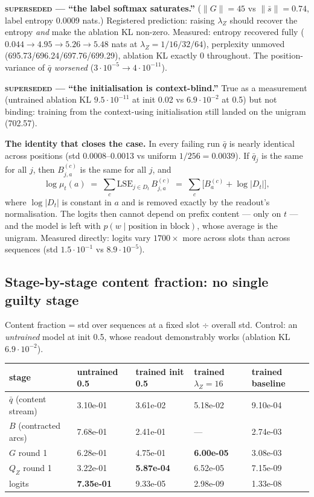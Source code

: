 \documentclass[10pt,a4paper]{article}
\newcommand{\qbar}{\ensuremath{\bar q}}
\begin{document}
\textbf{\textsc{superseded} --- ``the label softmax saturates.''} ($\lVert G\rVert = 45$ vs
$\lVert \bar s\rVert = 0.74$, label entropy 0.0009 nats.) Registered prediction: raising
$\lambda_Z$ should recover the entropy \emph{and} make the ablation KL non-zero. Measured:
entropy recovered fully ($0.044 \to 4.95 \to 5.26 \to 5.48$ nats at $\lambda_Z=1/16/32/64$),
perplexity unmoved (695.73/696.24/697.76/699.29), ablation KL exactly 0 throughout. The
position-variance of \qbar{} \emph{worsened} ($3\cdot10^{-5} \to 4\cdot10^{-11}$).

\textbf{\textsc{superseded} --- ``the initialisation is context-blind.''} True as a
measurement (untrained ablation KL $9.5\cdot10^{-11}$ at init 0.02 vs $6.9\cdot10^{-2}$ at
0.5) but not binding: training from the context-using initialisation still landed on the
unigram (702.57).

\textbf{The identity that closes the case.} In every failing run \qbar{} is nearly identical
across positions (std 0.0008--0.0013 vs uniform $1/256 = 0.0039$). If $\qbar_j$ is the same
for all $j$, then $B^{(c)}_{j,a}$ is the same for all $j$, and
\[
\log \mu_t(a) \;=\; \textstyle\sum_c \mathrm{LSE}_{j\in D_t}\, B^{(c)}_{j,a}
\;=\; \textstyle\sum_c \big[B^{(c)}_{a} + \log|D_t|\big],
\]
where $\log|D_t|$ is constant in $a$ and is removed exactly by the readout's normalisation.
The logits then cannot depend on prefix content --- only on $t$ --- and the model is left
with $p(w \mid \text{position in block})$, whose average is the unigram. Measured directly:
logits vary $1700\times$ more across slots than across sequences (std $1.5\cdot10^{-1}$ vs
$8.9\cdot10^{-5}$).

\subsection{Stage-by-stage content fraction: no single guilty stage}

Content fraction = std over sequences at a fixed slot $\div$ overall std. Control: an
\emph{untrained} model at init 0.5, whose readout demonstrably works (ablation KL
$6.9\cdot10^{-2}$).

\begin{table}[h]\centering\small
\begin{tabular}{lllll}
\toprule
stage & untrained 0.5 & trained init 0.5 & trained $\lambda_Z{=}16$ & trained baseline\\
\midrule
\qbar{} (content stream) & 3.10e-01 & 3.61e-02 & 5.18e-02 & 9.10e-04\\
$B$ (contracted arcs) & 7.68e-01 & 2.41e-01 & --- & 2.74e-03\\
$G$ round 1 & 6.28e-01 & 4.75e-01 & \textbf{6.00e-05} & 3.08e-03\\
$Q_Z$ round 1 & 3.22e-01 & \textbf{5.87e-04} & 6.52e-05 & 7.15e-09\\
logits & \textbf{7.35e-01} & 9.33e-05 & 2.98e-09 & 1.33e-08\\
\bottomrule
\end{tabular}
\end{table}
\end{document}
